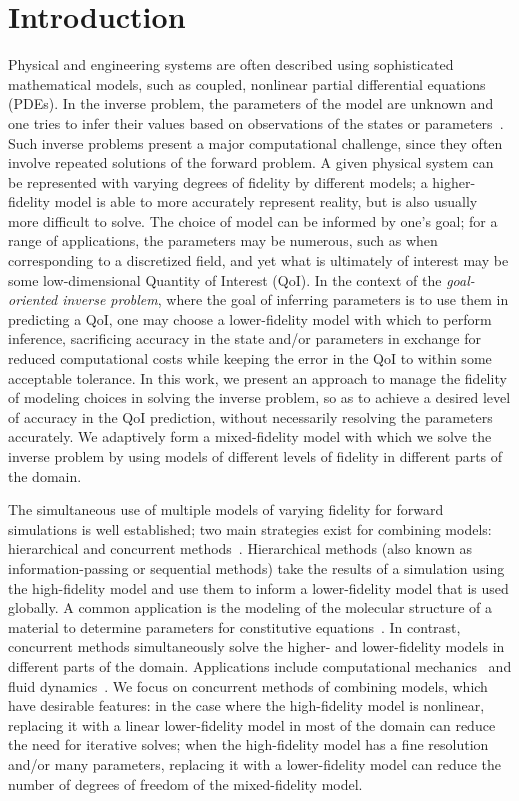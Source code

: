 \section{Introduction}

Physical and engineering systems are often described using sophisticated mathematical models, such as coupled, nonlinear partial differential equations (PDEs). In the inverse problem, the parameters of the model are unknown and one tries to infer their values based on observations of the states or parameters~\cite{Taran05, BanksKuhn89}. Such inverse problems present a major computational challenge, since they often involve repeated solutions of the forward problem. A given physical system can be represented with varying degrees of fidelity by different models; a higher-fidelity model is able to more accurately represent reality, but is also usually more difficult to solve. The choice of model can be informed by one's goal; for a range of applications, the parameters may be numerous, such as when corresponding to a discretized field, and yet what is ultimately of interest may be some low-dimensional Quantity of Interest (QoI). In the context of the \textit{goal-oriented inverse problem}, where the goal of inferring parameters is to use them in predicting a QoI, one may choose a lower-fidelity model with which to perform inference, sacrificing accuracy in the state and/or parameters in exchange for reduced computational costs while keeping the error in the QoI to within some acceptable tolerance.  In this work, we present an approach to manage the fidelity of modeling choices in solving the inverse problem, so as to achieve a desired level of accuracy in the QoI prediction, without necessarily resolving the parameters accurately. We adaptively form a mixed-fidelity model with which we solve the inverse problem by using models of different levels of fidelity in different parts of the domain.

The simultaneous use of multiple models of varying fidelity for forward simulations is well established; two main strategies exist for combining models: hierarchical and concurrent methods~\cite{Liuetal03}. Hierarchical methods (also known as information-passing or sequential methods) take the results of a simulation using the high-fidelity model and use them to inform a lower-fidelity model that is used globally. A common application is the modeling of the molecular structure of a material to determine parameters for constitutive equations~\cite{Haoetal03,Weietal04}. In contrast, concurrent methods simultaneously solve the higher- and lower-fidelity models in different parts of the domain. Applications include computational mechanics~\cite{Khareetal08,Prudetal08} and fluid dynamics~\cite{vanOpstaletal15,LucKinBer02,FatGerQua01}. We focus on concurrent methods of combining models, which have desirable features: in the case where the high-fidelity model is nonlinear, replacing it with a linear lower-fidelity model in most of the domain can reduce the need for iterative solves; when the high-fidelity model has a fine resolution and/or many parameters, replacing it with a lower-fidelity model can reduce the number of degrees of freedom of the mixed-fidelity model.


